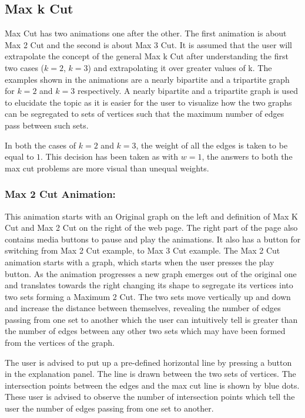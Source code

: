 \subsection{Max k Cut}
\label{story: maxkcut}
Max Cut has two animations one after the other. The first animation is about
Max 2 Cut and the second is about Max 3 Cut.  It is assumed that the user will
extrapolate the concept of the general Max k Cut after understanding the first
two cases ($k=2$, $k=3$) and extrapolating it over greater values of k.  The
examples shown in the animations are a nearly bipartite and a tripartite graph
for $k=2$ and $k=3$ respectively.  A nearly bipartite and a tripartite graph is
used to elucidate the topic as it is easier for the user to visualize how the
two graphs can be segregated to sets of vertices such that the maximum number
of edges pass between such sets.

In both the cases of $k=2$ and $k=3$, the weight of all the edges is taken to
be equal to $1$. This decision has been taken as with $w=1$, the answers to
both the max cut problems are more visual than unequal weights.

\subsubsection{Max 2 Cut Animation:} 
\label{story: max2cut}
This animation starts with an Original graph on the left and definition of Max K Cut and
Max 2 Cut on the right of the web page. The right part of the page also
contains media buttons to pause and play the animations. It also has a button
for switching from Max 2 Cut example, to Max 3 Cut example.  The Max 2 Cut
animation starts with a graph, which starts when the user presses the play
button. As the animation progresses a new graph emerges out of the original
one and translates towards the right changing its shape to segregate its
vertices into two sets forming a Maximum 2 Cut. The two sets move vertically up
and down and increase the distance between themselves, revealing the
number of edges passing from one set to another which the user can intuitively
tell is greater than the number of edges between any other two sets
which may have been formed from the vertices of the graph.

The user is advised to put up a pre-defined horizontal line by pressing a
button in the explanation panel. The line is drawn between the two sets of
vertices.  The intersection points between the edges and the max cut line is
shown by blue dots. These user is advised to observe the number of intersection
points which tell the user the number of edges passing from one set to another.

